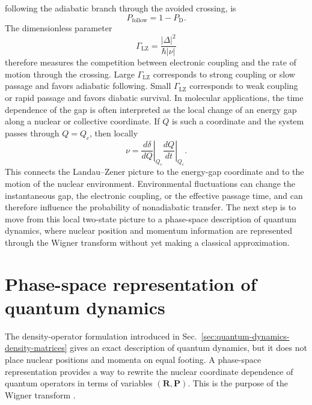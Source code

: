 \documentclass[
  11pt,
  letterpaper,
  onehalfspacing,
  normalmargins,
  equalmargins,
  oneside
]{ut-thesis}
\begin{document}
following the adiabatic branch through the avoided crossing, is \begin{equation} P_{\mathrm{follow}} = 1-P_{\mathrm D}. \label{eq:lz-adiabatic-following-probability} \end{equation} The dimensionless parameter \begin{equation} \Gamma_{\mathrm{LZ}} = \frac{|\Delta|^2} {\hbar |\nu|} \label{eq:lz-adiabaticity-parameter} \end{equation} therefore measures the competition between electronic coupling and the rate of motion through the crossing. Large \(\Gamma_{\mathrm{LZ}}\) corresponds to strong coupling or slow passage and favors adiabatic following. Small \(\Gamma_{\mathrm{LZ}}\) corresponds to weak coupling or rapid passage and favors diabatic survival. In molecular applications, the time dependence of the gap is often interpreted as the local change of an energy gap along a nuclear or collective coordinate. If \(Q\) is such a coordinate and the system passes through \(Q=Q_c\), then locally \begin{equation} \nu = \left. \frac{d\delta}{dQ} \right|_{Q_c} \left. \frac{dQ}{dt} \right|_{Q_c}. \label{eq:lz-molecular-sweep-rate} \end{equation} This connects the Landau--Zener picture to the energy-gap coordinate and to the motion of the nuclear environment. Environmental fluctuations can change the instantaneous gap, the electronic coupling, or the effective passage time, and can therefore influence the probability of nonadiabatic transfer. The next step is to move from this local two-state picture to a phase-space description of quantum dynamics, where nuclear position and momentum information are represented through the Wigner transform without yet making a classical approximation.

\section{Phase-space representation of quantum dynamics}
\label{sec:phase-space-quantum-dynamics}

The density-operator formulation introduced in
Sec.~\ref{sec:quantum-dynamics-density-matrices} gives an exact description
of quantum dynamics, but it does not place nuclear positions and momenta on
equal footing. A phase-space representation provides a way to rewrite the
nuclear coordinate dependence of quantum operators in terms of variables
\((\mathbf R,\mathbf P)\). This is the purpose of the Wigner transform
\cite{Weyl1927,Wigner1932,Groenewold1946,Moyal1949,Hillery1984,Case2008,
Polkovnikov2010}.
\end{document}
